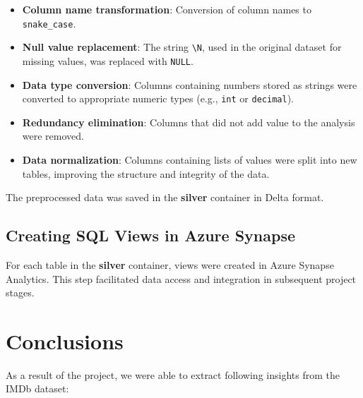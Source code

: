 \documentclass[a4paper,12pt]{article}
\begin{document}
\begin{itemize}
    \item \textbf{Column name transformation}: Conversion of column names to \texttt{snake\_case}.
    \item \textbf{Null value replacement}: The string \texttt{\textbackslash N}, used in the original dataset for missing values, was replaced with \texttt{NULL}.
    \item \textbf{Data type conversion}: Columns containing numbers stored as strings were converted to appropriate numeric types (e.g., \texttt{int} or \texttt{decimal}).
    \item \textbf{Redundancy elimination}: Columns that did not add value to the analysis were removed.
    \item \textbf{Data normalization}: Columns containing lists of values were split into new tables, improving the structure and integrity of the data.
\end{itemize}

The preprocessed data was saved in the \textbf{silver} container in Delta format.

\subsection{Creating SQL Views in Azure Synapse}
For each table in the \textbf{silver} container, views were created in Azure Synapse Analytics. This step facilitated data access and integration in subsequent project stages.

\section{Conclusions}
\label{sec:conclusions}

As a result of the project, we were able to extract following insights from the IMDb dataset:
\end{document}
